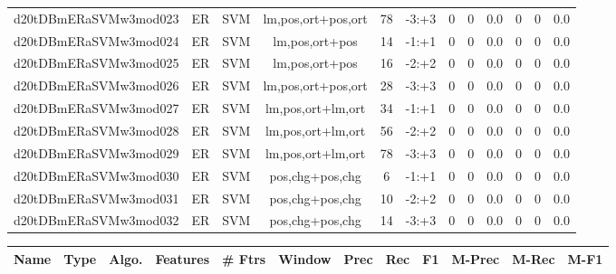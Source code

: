 \documentclass[a4paper]{article}
\begin{document}
\begin{landscape}
\begin{center}
\begin{tabular}{ |c|c|c|c|c|c|c|c|c|c|c|c|}
 
 	
 	\small{ d20tDBmERaSVMw3mod023 } & ER & SVM & lm,pos,ort+pos,ort  &  78 &  -3:+3  &  0 & 0 & 0.0  &  0 & 0 & 0.0 \\
 	

 
 	
 	\small{ d20tDBmERaSVMw3mod024 } & ER & SVM & lm,pos,ort+pos  &  14 &  -1:+1  &  0 & 0 & 0.0  &  0 & 0 & 0.0 \\
 	

 
 	
 	\small{ d20tDBmERaSVMw3mod025 } & ER & SVM & lm,pos,ort+pos  &  16 &  -2:+2  &  0 & 0 & 0.0  &  0 & 0 & 0.0 \\
 	

 
 	
 	\small{ d20tDBmERaSVMw3mod026 } & ER & SVM & lm,pos,ort+pos,ort  &  28 &  -3:+3  &  0 & 0 & 0.0  &  0 & 0 & 0.0 \\
 	

 
 	
 	\small{ d20tDBmERaSVMw3mod027 } & ER & SVM & lm,pos,ort+lm,ort  &  34 &  -1:+1  &  0 & 0 & 0.0  &  0 & 0 & 0.0 \\
 	

 
 	
 	\small{ d20tDBmERaSVMw3mod028 } & ER & SVM & lm,pos,ort+lm,ort  &  56 &  -2:+2  &  0 & 0 & 0.0  &  0 & 0 & 0.0 \\
 	

 
 	
 	\small{ d20tDBmERaSVMw3mod029 } & ER & SVM & lm,pos,ort+lm,ort  &  78 &  -3:+3  &  0 & 0 & 0.0  &  0 & 0 & 0.0 \\
 	

 
 	
 	\small{ d20tDBmERaSVMw3mod030 } & ER & SVM & pos,chg+pos,chg  &  6 &  -1:+1  &  0 & 0 & 0.0  &  0 & 0 & 0.0 \\
 	

 
 	
 	\small{ d20tDBmERaSVMw3mod031 } & ER & SVM & pos,chg+pos,chg  &  10 &  -2:+2  &  0 & 0 & 0.0  &  0 & 0 & 0.0 \\
 	

 
 	
 	\small{ d20tDBmERaSVMw3mod032 } & ER & SVM & pos,chg+pos,chg  &  14 &  -3:+3  &  0 & 0 & 0.0  &  0 & 0 & 0.0 \\
 	
 \hline
\end{tabular}
\end{center}




\begin{center}
\begin{tabular}{ |c|c|c|c|c|c|c|c|c|c|c|c|} 
 \hline
 	Name & Type & Algo. & Features & \# Ftrs & Window & Prec & Rec & F1 & M-Prec & M-Rec & M-F1\\
 \hline


\end{tabular}
\end{center}
\end{landscape}
\end{document}
